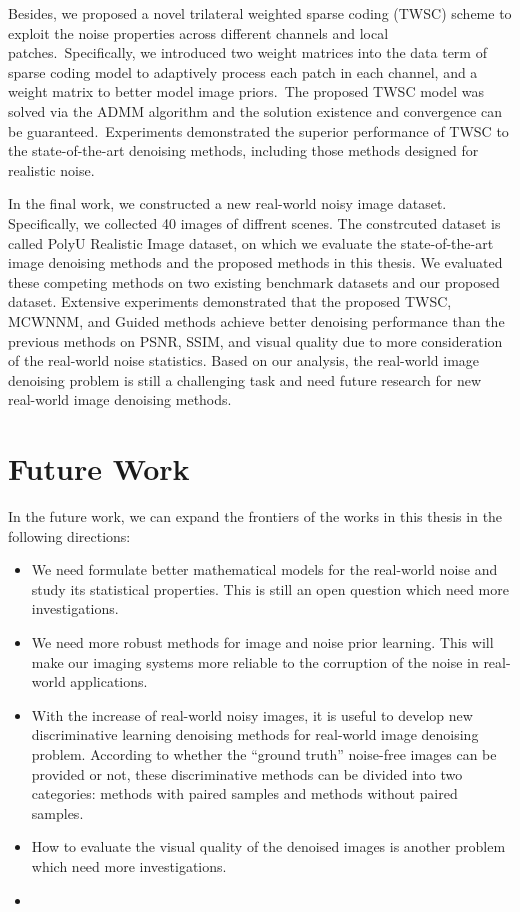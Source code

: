 Besides, we proposed a novel trilateral weighted sparse coding (TWSC) scheme to exploit the noise properties across different channels and local patches.\ Specifically, we introduced two weight matrices into the data term of sparse coding model to adaptively process each patch in each channel, and a weight matrix to better model image priors.\ The proposed TWSC model was solved via the ADMM algorithm and the solution existence and convergence can be guaranteed.\ Experiments demonstrated the superior performance of TWSC to the state-of-the-art denoising methods, including those methods designed for realistic noise.

In the final work, we constructed a new real-world noisy image dataset. Specifically, we collected 40 images of diffrent scenes. The constrcuted dataset is called PolyU Realistic Image dataset, on which we evaluate the state-of-the-art image denoising methods and the proposed methods in this thesis. We evaluated these competing methods on two existing benchmark datasets and our proposed dataset. Extensive experiments demonstrated that the proposed TWSC, MCWNNM, and Guided methods achieve better denoising performance than the previous methods on PSNR, SSIM, and visual quality due to more consideration of the real-world noise statistics. Based on our analysis, the real-world image denoising problem is still a challenging task and need future research for new real-world image denoising methods.

\section{Future Work}
\label{sec:conclusions:future}

In the future work, we can expand the frontiers of the works in this thesis in the following directions:

\begin{itemize}
\item We need formulate better mathematical models for the real-world noise and study its statistical properties. This is still an open question which need more investigations.

\item We need more robust methods for image and noise prior learning. This will make our imaging systems more reliable to the corruption of the noise in real-world applications.

\item With the increase of real-world noisy images, it is useful to develop new discriminative learning denoising methods for real-world image denoising problem. According to whether the ``ground truth'' noise-free images can be provided or not, these discriminative methods can be divided into two categories: methods with paired samples and methods without paired samples. 

\item How to evaluate the visual quality of the denoised images is another problem which need more investigations.

\item

\end{itemize}
